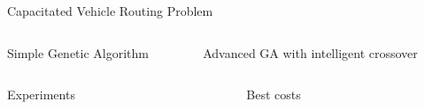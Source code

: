 \documentclass[ %
                    author={Callum Mann},
                     title={Genetic algorithms for the CVRP},
                  subtitle={Capacitated Vehicle Routing Problem},
                      type={Heuristics},
                      year={2016}]{poster}
\begin{document}

\begin{frame}{}

\vfill

\begin{columns}[t]
  \begin{column}{0.900\linewidth}
  \begin{block}{\Large Capacitated Vehicle Routing Problem}
    \vspace{10cm}
  \end{block}
  \end{column}
\end{columns}

\vfill

\begin{columns}[t]
  \begin{column}{0.422\linewidth}
  \begin{block}{\Large Simple Genetic Algorithm}
\vspace{10cm}
  \end{block}
  \end{column}

  \begin{column}{0.422\linewidth}
  \begin{block}{\Large Advanced GA with intelligent crossover}
\vspace{10cm}
  \end{block}
  \end{column}
\end{columns}

\vfill

\begin{columns}[t]
  \begin{column}{0.422\linewidth}
  \begin{block}{\Large Experiments}
  \vspace{10cm}
  \end{block}
  \end{column}
  \begin{column}{0.422\linewidth}
  \begin{block}{\Large Best costs}
    \vspace{10cm}
  \end{block}
  \end{column}
\end{columns}

\vfill

\end{frame}

\end{document}
